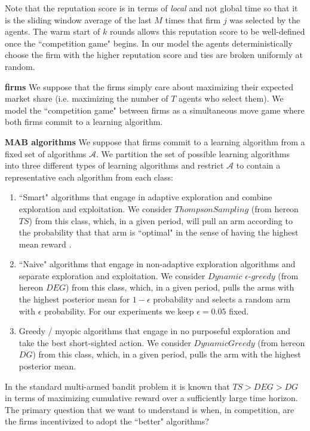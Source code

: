 \documentclass{article}
\theoremstyle{definition}
\begin{document}
Note that the reputation score is in terms of \textit{local} and not global time so that it is the sliding window average of the last $M$ times that firm $j$ was selected by the agents. The warm start of $k$ rounds allows this reputation score to be well-defined once the ``competition game" begins. In our model the agents deterministically choose the firm with the higher reputation score and ties are broken uniformly at random.

\noindent \textbf{firms} We suppose that the firms simply care about maximizing their expected market share (i.e. maximizing the number of $T$ agents who select them). We model the ``competition game" between firms as a simultaneous move game where both firms commit to a learning algorithm.

\noindent \textbf{MAB algorithms} We suppose that firms commit to a learning algorithm from a fixed set of algorithms $\mathcal{A}$. We partition the set of possible learning algorithms into three different types of learning algorithms and restrict $\mathcal{A}$ to contain a representative each algorithm from each class:
\begin{enumerate}
\item ``Smart" algorithms that engage in adaptive exploration and combine exploration and exploitation. We consider $Thompson Sampling$ (from hereon $TS$) from this class, which, in a given period, will pull an arm according to the probability that that arm is ``optimal" in the sense of having the highest mean reward \citep{agrawal2012analysis}.
\item ``Naive" algorithms that engage in non-adaptive exploration algorithms and separate exploration and exploitation. We consider $Dynamic$ $\epsilon$-$greedy$ (from hereon $DEG$) from this class, which, in a given period, pulls the arms with the highest posterior mean for $1 - \epsilon$ probability and selects a random arm with $\epsilon$ probability. For our experiments we keep $\epsilon = 0.05$ fixed.
\item Greedy / myopic algorithms that engage in no purposeful exploration and take the best short-sighted action. We consider $DynamicGreedy$ (from hereon $DG$) from this class, which, in a given period, pulls the arm with the highest posterior mean.
\end{enumerate}

In the standard multi-armed bandit problem it is known that $TS > DEG > DG$ in terms of maximizing cumulative reward over a sufficiently large time horizon. The primary question that we want to understand is when, in competition, are the firms incentivized to adopt the ``better" algorithms?
\end{document}
